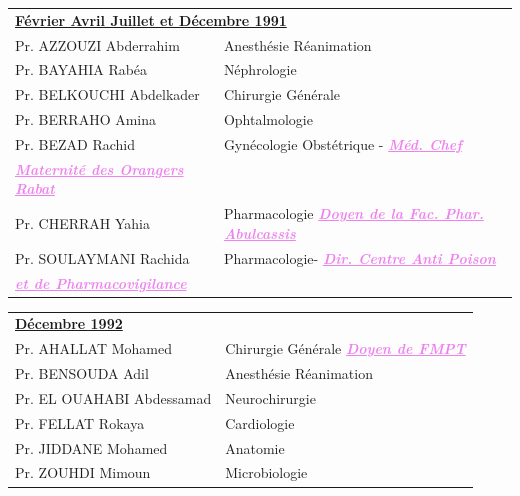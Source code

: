  \begin{table}[H]
  \begin{tabular}{l l}
 \multicolumn{2}{l}{\textbf{\underline{Février Avril Juillet et Décembre 1991}}}\vspace*{.5em}\\
Pr. AZZOUZI Abderrahim & \hspace*{5em} Anesthésie Réanimation\\  
Pr. BAYAHIA Rabéa & \hspace*{5em} Néphrologie\\  Pr. BELKOUCHI Abdelkader & \hspace*{5em} Chirurgie Générale\\
Pr. BERRAHO Amina & \hspace*{5em} Ophtalmologie\\ 
Pr. BEZAD Rachid & \hspace*{5em} Gynécologie Obstétrique - \textcolor{violet}{\textbf{\emph{\underline{Méd. Chef}}}}\\
\textcolor{violet}{\textbf{\emph{\underline{Maternité des Orangers Rabat}}}} & \\
Pr. CHERRAH Yahia & Pharmacologie \textcolor{violet}{\textbf{\emph{\underline{Doyen de la Fac. Phar. Abulcassis}}}}\\
Pr. SOULAYMANI Rachida & Pharmacologie- \textcolor{violet}{\textbf{\emph{\underline{Dir. Centre Anti Poison }}}}\\
\textcolor{violet}{\textbf{\emph{\underline{et de Pharmacovigilance}}}} & \\
\end{tabular} 
\end{table}

\vspace*{1em}

\begin{table}[H]
  \begin{tabular}{l l}
    \multicolumn{2}{l}{\textbf{\underline{Décembre 1992}}}\vspace*{.5em}\\
    Pr. AHALLAT Mohamed & \hspace*{3em} Chirurgie Générale \textcolor{violet}{\textbf{\emph{\underline{Doyen de FMPT }}}}\\  
    Pr. BENSOUDA Adil	& \hspace*{3em}  Anesthésie Réanimation \\
Pr. EL OUAHABI Abdessamad &	\hspace*{3em} Neurochirurgie\\
Pr. FELLAT Rokaya	& \hspace*{3em} Cardiologie\\
Pr. JIDDANE Mohamed	& \hspace*{3em} Anatomie\\
Pr. ZOUHDI Mimoun	& \hspace*{3em} Microbiologie\\

   \end{tabular}
\end{table}

